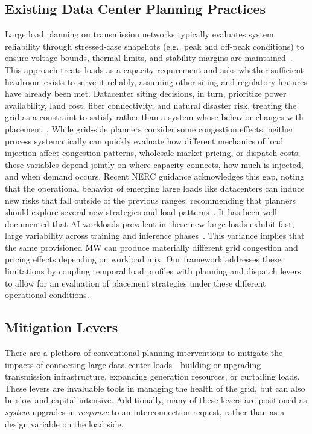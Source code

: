 \subsection{Existing Data Center Planning Practices}
Large load planning on transmission networks typically evaluates system reliability through stressed-case snapshots (e.g., peak and off-peak conditions) to ensure voltage bounds, thermal limits, and stability margins are maintained~\cite{nerc_tpl001_5.1}. This approach treats loads as a capacity requirement and asks whether sufficient headroom exists to serve it reliably, assuming other siting and regulatory features have already been met. Datacenter siting decisions, in turn, prioritize power availability, land cost, fiber connectivity, and natural disaster risk, treating the grid as a constraint to satisfy rather than a system whose behavior changes with placement~\cite{goiri2011intelligentplacement,ALAPERA201869}. While grid-side planners consider some congestion effects, neither process systematically can quickly evaluate how different mechanics of load injection affect congestion patterns, wholesale market pricing, or dispatch costs; these variables depend jointly on where capacity connects, how much is injected, and when demand occurs. Recent NERC guidance acknowledges this gap, noting that the operational behavior of emerging large loads like datacenters can induce new risks that fall outside of the previous ranges; recommending that planners should explore several new strategies and load patterns~\cite{nerc2026}. It has been well documented that AI workloads prevalent in these new large loads exhibit fast, large variability across training and inference phases~\cite{chen2025electricitydemandgridimpacts, patel2024llms, li2024unseenaidisruptionspower, dynamollm}. This variance implies that the same provisioned MW can produce materially different grid congestion and pricing effects depending on workload mix. Our framework addresses these limitations by coupling temporal load profiles with planning and dispatch levers to allow for an evaluation of placement strategies under these different operational conditions.

\subsection{Mitigation Levers}

There are a plethora of conventional planning interventions to mitigate the impacts of connecting large data center loads—building or upgrading transmission infrastructure, expanding generation resources, or curtailing loads. These levers are invaluable tools in managing the health of the grid, but can also be slow and capital intensive. Additionally, many of these levers are positioned as \emph{system} upgrades in \emph{response} to an interconnection request, rather than as a design variable on the load side. 

